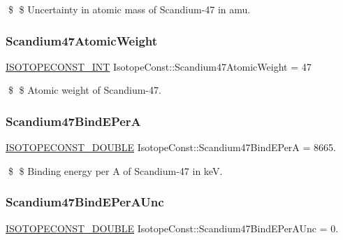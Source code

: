 \$ \$ Uncertainty in atomic mass of Scandium-\/47 in amu. \mbox{\label{group___isotope_const-_scandium-_sc47_gad0e54ed05cf04098eacd859eb5cb5f83}} 
\subsubsection{\texorpdfstring{Scandium47\+Atomic\+Weight}{Scandium47AtomicWeight}}
{\footnotesize\ttfamily \mbox{\hyperlink{group___isotope_const-_macros_ga5f18360b3e99483a35c32d789e62621c}{I\+S\+O\+T\+O\+P\+E\+C\+O\+N\+S\+T\+\_\+\+I\+NT}} Isotope\+Const\+::\+Scandium47\+Atomic\+Weight = 47}

\$ \$ Atomic weight of Scandium-\/47. \mbox{\label{group___isotope_const-_scandium-_sc47_gac9a0e413db4e2ebc5167ad5da2173764}} 
\subsubsection{\texorpdfstring{Scandium47\+Bind\+E\+PerA}{Scandium47BindEPerA}}
{\footnotesize\ttfamily \mbox{\hyperlink{group___isotope_const-_macros_ga8f45a7272ce02c0b4c65c44636ed719a}{I\+S\+O\+T\+O\+P\+E\+C\+O\+N\+S\+T\+\_\+\+D\+O\+U\+B\+LE}} Isotope\+Const\+::\+Scandium47\+Bind\+E\+PerA = 8665.}

\$ \$ Binding energy per A of Scandium-\/47 in keV. \mbox{\label{group___isotope_const-_scandium-_sc47_gac27ac534257f1c72fef3ece7a3803513}} 
\subsubsection{\texorpdfstring{Scandium47\+Bind\+E\+Per\+A\+Unc}{Scandium47BindEPerAUnc}}
{\footnotesize\ttfamily \mbox{\hyperlink{group___isotope_const-_macros_ga8f45a7272ce02c0b4c65c44636ed719a}{I\+S\+O\+T\+O\+P\+E\+C\+O\+N\+S\+T\+\_\+\+D\+O\+U\+B\+LE}} Isotope\+Const\+::\+Scandium47\+Bind\+E\+Per\+A\+Unc = 0.}

